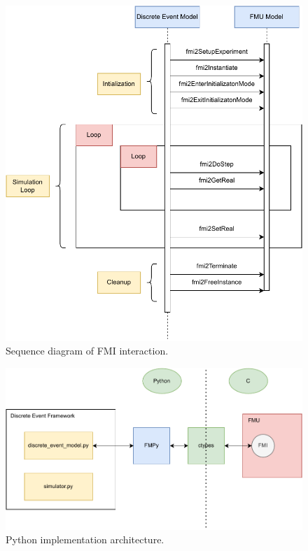 \documentclass[conference]{IEEEtran}
\begin{document}
\begin{figure}[htbp]
  \centering
  \includegraphics[width=\linewidth]{images/fmi-sequence.drawio.pdf}
  \caption{Sequence diagram of FMI interaction.}
  \label{fmi-sequence}
\end{figure}

\begin{figure}[htbp]
  \centering
  \includegraphics[width=\linewidth]{images/python-implementation-architecture.drawio.pdf}
  \caption{Python implementation architecture.}
  \label{python-implementation-architecture}
\end{figure}
\end{document}
